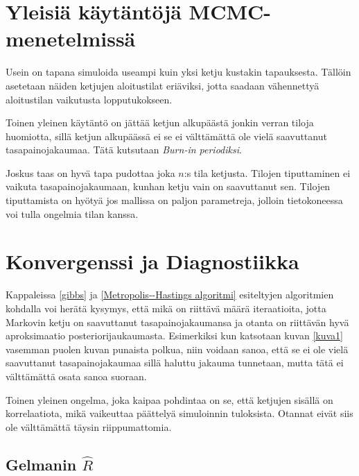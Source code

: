 \section{Yleisiä käytäntöjä MCMC-menetelmissä}

Usein on tapana simuloida useampi kuin yksi ketju kustakin tapauksesta. Tällöin asetetaan näiden ketjujen aloitustilat eriäviksi, jotta saadaan vähennettyä aloitustilan vaikutusta lopputukokseen.

Toinen yleinen käytäntö on jättää ketjun alkupäästä jonkin verran tiloja huomiotta, sillä ketjun alkupäässä ei se ei välttämättä ole vielä saavuttanut tasapainojakaumaa. Tätä kutsutaan \textit{Burn-in periodiksi}.

Joskus taas on hyvä tapa pudottaa joka $n$:s tila ketjusta. Tilojen tiputtaminen ei vaikuta tasapainojakaumaan, kunhan ketju vain on saavuttanut sen. Tilojen tiputtamista on hyötyä jos mallissa on paljon parametreja, jolloin tietokoneessa voi tulla ongelmia tilan kanssa.

\section{Konvergenssi ja Diagnostiikka}

Kappaleissa \ref{gibbs} ja \ref{Metropolis--Hastings algoritmi} esiteltyjen algoritmien kohdalla voi herätä kysymys, että mikä on riittävä määrä iteraatioita, jotta Markovin ketju on saavuttanut tasapainojakaumansa ja otanta on riittävän hyvä aproksimaatio posteriorijaukaumasta. Esimerkiksi kun katsotaan kuvan \ref{kuva1} vasemman puolen kuvan punaista polkua, niin voidaan sanoa, että se ei ole vielä saavuttanut tasapainojakaumaa sillä haluttu jakauma tunnetaan, mutta tätä ei välttämättä osata sanoa suoraan. 

Toinen yleinen ongelma, joka kaipaa pohdintaa on se, että ketjujen sisällä on korrelaatiota, mikä vaikeuttaa päättelyä simuloinnin tuloksista. Otannat eivät siis ole välttämättä täysin riippumattomia.

\subsection{Gelmanin $\hat{R}$}

